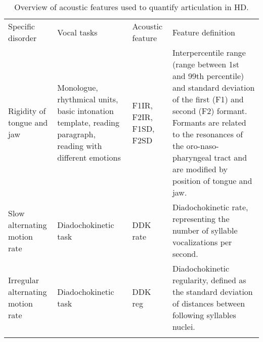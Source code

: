 \newpage

\begin{table*}[htb!]
	\caption{Overview of acoustic features used to quantify articulation in HD.}
	\footnotesize
    \centering
	\label{tab:articulation_features}
	
	
	\begin{tabularx}{1.00\textwidth}{mmsX}
		\hline\hline\noalign{\smallskip}
		Specific disorder & Vocal tasks & Acoustic feature & Feature definition \\
		\noalign{\smallskip}\hline\noalign{\smallskip}
		Rigidity of tongue and jaw & Monologue, rhythmical units, basic intonation template, reading paragraph, reading with different emotions & F1IR, F2IR, F1SD, F2SD & Interpercentile range (range between 1st and 99th percentile) and standard deviation of the first (F1) and second (F2) formant. Formants are related to the resonances of the oro-naso-pharyngeal tract and are modified by position of tongue and jaw. \\
		Slow alternating motion rate & Diadochokinetic task & DDK rate & Diadochokinetic rate, representing the number of syllable vocalizations per second. \\
		Irregular alternating motion rate & Diadochokinetic task & DDK reg & Diadochokinetic regularity, defined as the standard deviation of distances between following syllables nuclei. \\
		\noalign{\smallskip}\hline\hline
	\end{tabularx}
\end{table*}

\newpage

